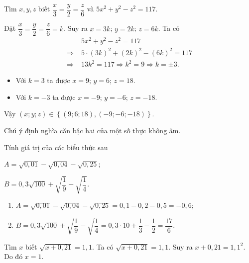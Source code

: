 \begin{vd}
Tìm $x,y,z$ biết $\dfrac{x}{3}=\dfrac{y}{2}=\dfrac{z}{6}$ và $5x^2+y^2-z^2=117$.
\loigiai
{
Đặt $\dfrac{x}{3}=\dfrac{y}{2}=\dfrac{z}{6}=k$. Suy ra $x=3k$; $y=2k$; $z=6k$. Ta có 
\begin{align*}
&5x^2+y^2-z^2=117\\ 
\Rightarrow\;&5\cdot (3k)^2+(2k)^2-(6k)^2=117\\
\Rightarrow\;&13k^2=117\Rightarrow k^2=9\Rightarrow k=\pm 3.
\end{align*}
		\begin{itemize}
		\item Với $k=3$ ta được $x=9$; $y=6$; $z=18$.
		\item Với $k=-3$ ta được $x=-9$; $y=-6$; $z=-18$.
		\end{itemize}
Vậy $(x;y;z)\in \left\{(9;6;18), (-9;-6;-18)\right\}$.
}
\end{vd}
\begin{dang}
Chú ý định nghĩa căn bậc hai của một số thực không âm.
\end{dang}
\begin{vd}
Tính giá trị của các biểu thức sau
\begin{listEX}[2]
	\item $A=\sqrt{0,01}-\sqrt{0,04}-\sqrt{0,25}$;
	\item $B=0,3\sqrt{100}+\sqrt{\dfrac{1}{9}}-\sqrt{\dfrac{1}{4}}$.
\end{listEX}
\loigiai
{
\begin{enumerate}
\item $A=\sqrt{0,01}-\sqrt{0,04}-\sqrt{0,25}=0,1-0,2-0,5=-0,6$;
\item $B=0,3\sqrt{100}+\sqrt{\dfrac{1}{9}}-\sqrt{\dfrac{1}{4}}=0,3\cdot 10+\dfrac{1}{3}-\dfrac{1}{2}=\dfrac{17}{6}$.
\end{enumerate}
}
\end{vd}
\begin{vd}
Tìm $x$ biết $\sqrt{x+0,21}=1,1$.
\loigiai
{
Ta có $\sqrt{x+0,21}=1,1$. Suy ra $x+0,21=1,1^2$. Do đó $x=1$.
}
\end{vd}


